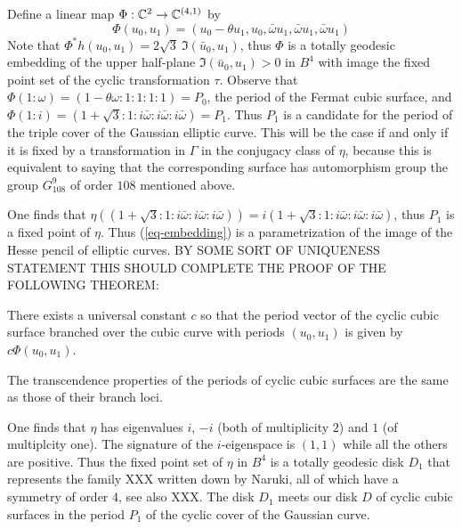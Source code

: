 Define a linear map $\Phi:{ \mathbb C }^2\to { \mathbb C }^{(4,1)}$ by \begin{equation}
\label{eq-embedding} \Phi(u_0,u_1) = (u_0 - \theta u_1,u_0,\bar\omega u_1,\bar\omega
u_1,\bar\omega u_1) \end{equation} Note that $\Phi^* h (u_0,u_1) = 2\sqrt{3}\ \Im{ (
\bar u_0, u_1)}$, thus $\Phi$ is a totally geodesic embedding of the upper half-plane
$\Im{(\bar u_0, u_1)} >0 $ in $B^4$ with image the fixed point set of the cyclic
transformation $\tau$. Observe that $\Phi(1:\omega) = (1 - \theta\omega : 1:1:1:1) =
P_0$, the period of the Fermat cubic surface, and $\Phi(1:i) =
(1+\sqrt{3}:1:i\bar\omega:i\bar\omega:i\bar\omega) = P_1$. Thus $P_1$ is a candidate
for the period of the triple cover of the Gaussian elliptic curve. This will be the
case if and only if it is fixed by a transformation in $\Gamma$ in the conjugacy class
of $\eta$, because this is equivalent to saying that the corresponding surface has
automorphism group the group $G_{108}^9$ of order $108$ mentioned above.

One finds that $\eta((1+\sqrt{3}:1:i\bar\omega:i\bar\omega:i\bar\omega)) = i
(1+\sqrt{3}:1:i\bar\omega:i\bar\omega:i\bar\omega)$, thus $P_1$ is a fixed point of
$\eta$. Thus (\ref{eq-embedding}) is a parametrization of the image of the Hesse pencil
of elliptic curves. BY SOME SORT OF UNIQUENESS STATEMENT THIS SHOULD COMPLETE THE PROOF
OF THE FOLLOWING THEOREM:

\begin{theorem} There exists a universal constant $c$ so that the period vector of the
cyclic cubic surface branched over the cubic curve with periods $(u_0,u_1)$ is given by
$c\Phi(u_0,u_1)$.

\end{theorem}



\begin{corollary} The transcendence properties of the periods of cyclic cubic surfaces
are the same as those of their branch loci. \end{corollary}



\begin{remark} One finds that $\eta$ has eigenvalues $i$, $-i$ (both of multiplicity
$2$) and $1$ (of multiplcity one). The signature of the $i$-eigenspace is $(1,1)$ while
all the others are positive. Thus the fixed point set of $\eta$ in $B^4$ is a totally
geodesic disk $D_1$ that represents the family XXX written down by Naruki, all of which
have a symmetry of order $4$, see also XXX. The disk $D_1$ meets our disk $D$ of cyclic
cubic surfaces in the period $P_1$ of the cyclic cover of the Gaussian curve.
\end{remark}




